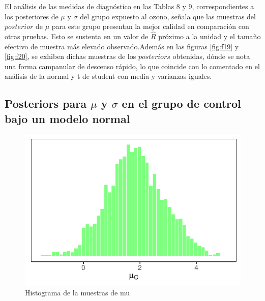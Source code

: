 \documentclass[
]{article}
\begin{document}
El análisis de las medidas de diagnóstico en las Tablas 8 y 9, correspondientes a los posteriores de \(\mu\) y \(\sigma\) del grupo expuesto al ozono, señala que las muestras del \(posterior\) de \(\mu\) para este grupo presentan la mejor calidad en comparación con otras pruebas. Esto se sustenta en un valor de \(\hat{R}\) próximo a la unidad y el tamaño efectivo de muestra más elevado observado.Además en las figuras \ref{fig:f19} y \ref{fig:f20}, se exhiben dichas muestras de los \(posteriors\) obtenidas, dónde se nota una forma campanular de descenso rápido, lo que coincide con lo comentado en el análisis de la normal y t de student con media y varianzas iguales.

\subsection{\texorpdfstring{Posteriors para \(\mu\) y \(\sigma\) en el grupo de control bajo un modelo normal}{Posteriors para \textbackslash mu y \textbackslash sigma en el grupo de control bajo un modelo normal}}\label{posteriors-para-mu-y-sigma-en-el-grupo-de-control-bajo-un-modelo-normal}

\begin{figure}

{\centering \includegraphics{TP-2---El-Dibu-de-la-vida_files/figure-latex/f21-1} 

}

\caption{Histograma de la muestras de mu}\label{fig:f21}
\end{figure}
\end{document}

